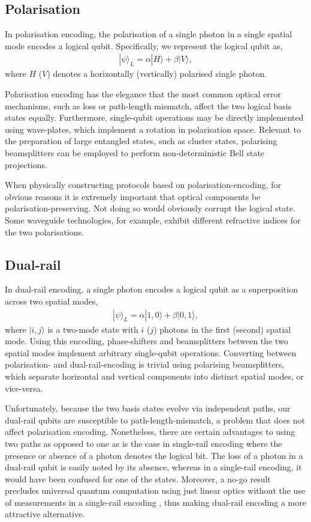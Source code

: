 \documentclass[times,final]{elsarticle}
\newcommand{\ket}[1]{|#1\rangle}
\begin{document}
\subsection{Polarisation}

In polarisation encoding, the polarisation of a single photon in a single spatial mode encodes a logical qubit. Specifically, we represent the logical qubit as,
\begin{align}
\ket\psi_L = \alpha\ket{H} + \beta\ket{V},	
\end{align}
where $H$ ($V$) denotes a horizontally (vertically) polarised single photon.

Polarisation encoding has the elegance that the most common optical error mechanisms, such as loss or path-length mismatch, affect the two logical basis states equally. Furthermore, single-qubit operations may be directly implemented using wave-plates, which implement a rotation in polarisation space. Relevant to the preparation of large entangled states, such as cluster states, polarising beamsplitters can be employed to perform non-deterministic Bell state projections.

When physically constructing protocols based on polarisation-encoding, for obvious reasons it is extremely important that optical components be polarisation-preserving. Not doing so would obviously corrupt the logical state. Some waveguide technologies, for example, exhibit different refractive indices for the two polarisations.

\subsection{Dual-rail}

In dual-rail encoding, a single photon encodes a logical qubit as a superposition across two spatial modes,
\begin{align}\label{eq:dualrail}
\ket\psi_L = \alpha\ket{1,0} + \beta\ket{0,1},
\end{align}
where $\ket{i,j}$ is a two-mode state with $i$ ($j$) photons in the first (second) spatial mode. Using this encoding, phase-shifters and beamsplitters between the two spatial modes implement arbitrary single-qubit operations. Converting between polarisation- and dual-rail-encoding is trivial using polarising beamsplitters, which separate horizontal and vertical components into distinct spatial modes, or vice-versa.

Unfortunately, because the two basis states evolve via independent paths, our dual-rail qubits are susceptible to path-length-mismatch, a problem that does not affect polarisation encoding. Nonetheless, there are certain advantages to using two paths as opposed to one as is the case in single-rail encoding where the presence or absence of a photon denotes the logical bit. The loss of a photon in a dual-rail qubit is easily noted by its absence, whereas in a single-rail encoding, it would have been confused for one of the states. Moreover, a no-go result precludes universal quantum computation using just linear optics without the use of measurements in a single-rail encoding \cite{bib:Wu13}, thus making dual-rail encoding a more attractive alternative.
\end{document}
